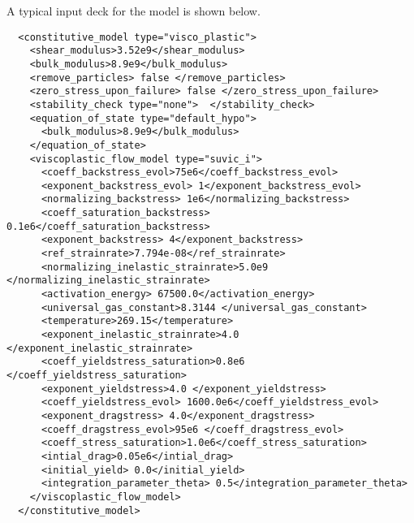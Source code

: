 A typical input deck for the  model is shown below.
\lstset{language=XML}
\begin{lstlisting}
  <constitutive_model type="visco_plastic">
    <shear_modulus>3.52e9</shear_modulus>
    <bulk_modulus>8.9e9</bulk_modulus>
    <remove_particles> false </remove_particles>
    <zero_stress_upon_failure> false </zero_stress_upon_failure>
    <stability_check type="none">  </stability_check>
    <equation_of_state type="default_hypo">
      <bulk_modulus>8.9e9</bulk_modulus>
    </equation_of_state>
    <viscoplastic_flow_model type="suvic_i">
      <coeff_backstress_evol>75e6</coeff_backstress_evol>
      <exponent_backstress_evol> 1</exponent_backstress_evol>
      <normalizing_backstress> 1e6</normalizing_backstress>
      <coeff_saturation_backstress> 0.1e6</coeff_saturation_backstress>
      <exponent_backstress> 4</exponent_backstress>
      <ref_strainrate>7.794e-08</ref_strainrate>
      <normalizing_inelastic_strainrate>5.0e9 </normalizing_inelastic_strainrate>
      <activation_energy> 67500.0</activation_energy>
      <universal_gas_constant>8.3144 </universal_gas_constant>
      <temperature>269.15</temperature>
      <exponent_inelastic_strainrate>4.0 </exponent_inelastic_strainrate>
      <coeff_yieldstress_saturation>0.8e6 </coeff_yieldstress_saturation>
      <exponent_yieldstress>4.0 </exponent_yieldstress>
      <coeff_yieldstress_evol> 1600.0e6</coeff_yieldstress_evol>
      <exponent_dragstress> 4.0</exponent_dragstress>
      <coeff_dragstress_evol>95e6 </coeff_dragstress_evol>
      <coeff_stress_saturation>1.0e6</coeff_stress_saturation>
      <intial_drag>0.05e6</intial_drag>
      <initial_yield> 0.0</initial_yield>
      <integration_parameter_theta> 0.5</integration_parameter_theta>
    </viscoplastic_flow_model>
  </constitutive_model>
\end{lstlisting}

